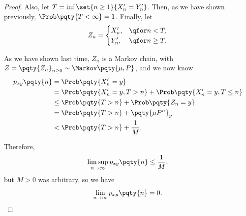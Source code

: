 \begin{proof}
    Also, let \(T = \inf\set{n \geq 1}{X'_n = Y'_n}\). Then, as we have shown previously, \(\Prob\pqty{T < \infty} = 1\). Finally, let
    \[
        Z_n = \begin{cases}
            X'_n, &\qfor n < T, \\
            Y'_n, &\qfor n \geq T.
        \end{cases}
    \]

    As we have shown last time, \(Z_n\) is a Markov chain, with \(Z = \pqty{Z_n}_{n \geq 0} \sim \Markov\pqty{\mu, P}\), and we now know
    \begin{align*}
        p_{xy}\pqty{n} &= \Prob\pqty{X_n' = y} \\
        &= \Prob\pqty{X_n' = y, T > n} + \Prob\pqty{X_n' = y, T \leq n} \\
        &\leq \Prob\pqty{T > n} + \Prob\pqty{Z_n = y} \\
        &= \Prob\pqty{T > n} + \pqty{\mu P^n}_y \\
        &< \Prob\pqty{T > n} + \frac{1}{M}.
    \end{align*}

    Therefore,
    \[
        \limsup_{n \to \infty} p_{xy}\pqty{n} \leq \frac{1}{M}.
    \]
    but \(M > 0\) was arbitrary, so we have
    \[
        \lim_{n \to \infty} p_{xy}\pqty{n} = 0.
    \]
\end{proof}